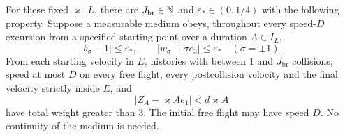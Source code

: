 \begin{lemma}\label{br:robust-block}
For these fixed \(\varkappa,L\), there are \(J_{\mathrm{br}}\in\mathbb N\) and
\(\varepsilon_*\in(0,1/4)\) with the following property. Suppose a
measurable medium obeys, throughout every speed-\(D\) excursion from
a specified starting point over a duration \(A\in I_L\),
\begin{equation}\label{br:medium-closeness}
|b_\sigma-1|\le\varepsilon_*,
\qquad |w_\sigma-\sigma e_3|\le\varepsilon_*
\quad(\sigma=\pm1).
\end{equation}
From each starting velocity in \(E\), histories with between \(1\) and
\(J_{\mathrm{br}}\) collisions, speed at most \(D\) on every free flight, every
postcollision velocity and the final velocity strictly inside \(E\), and
\begin{equation}\label{br:robust-drift}
|Z_A-\varkappa Ae_1|<d\varkappa A
\end{equation}
have total weight greater than 3. The initial free flight may have
speed \(D\). No continuity of the medium is needed.
\end{lemma}

